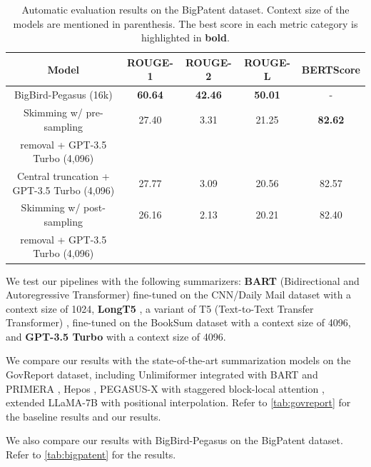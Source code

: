 \begin{table}[!ht]
	\centering

	\begin{tabular}{c c c c c}
		\hline
		\textbf{Model} & \textbf{ROUGE-1} & \textbf{ROUGE-2} & \textbf{ROUGE-L} &
		\textbf{BERTScore} \\
		\hline
		BigBird-Pegasus (16k) & \textbf{60.64} & \textbf{42.46} & \textbf{50.01} & - \\
		\hline
		Skimming w/ pre-sampling & 27.40 & 3.31 & 21.25 & \textbf{82.62} \\
		removal + GPT-3.5 Turbo (4,096) & & & & \\
		Central truncation + GPT-3.5 Turbo (4,096) & 27.77 & 3.09 & 20.56 & 82.57 \\
		Skimming w/ post-sampling & 26.16 & 2.13 & 20.21 & 82.40 \\
		removal + GPT-3.5 Turbo (4,096) & & & & \\
		\hline
	\end{tabular}

	\caption{Automatic evaluation results on the BigPatent dataset. Context size of the models are
	mentioned in parenthesis. The best score in each metric category is highlighted in \textbf{bold}.}
	\label{tab:bigpatent}
\end{table}

We test our pipelines with the following summarizers: \textbf{BART} (Bidirectional
and Autoregressive Transformer) \cite{lewis-etal-2020-bart} fine-tuned on the
CNN/Daily Mail dataset \cite{nallapati2016abstractive} with a context size of 1024,
\textbf{LongT5} \cite{guo2021longt5}, a variant of T5 (Text-to-Text Transfer
Transformer) \cite{raffel2020exploring}, fine-tuned on the BookSum dataset with
a context size of 4096, and \textbf{GPT-3.5 Turbo} \cite{brown2020language} with a
context size of 4096.

We compare our results with the state-of-the-art summarization models on the GovReport dataset,
including Unlimiformer \cite{bertsch2023unlimiformer} integrated with BART \cite{lewis-etal-2020-bart}
and PRIMERA \cite{beltagy2020longformer}, Hepos \cite{huang-etal-2021-efficient},
PEGASUS-X with staggered block-local attention \cite{phang2022investigating}, extended
LLaMA-7B with positional interpolation.
Refer to \autoref{tab:govreport} for the baseline results and our results.

We also compare our results with BigBird-Pegasus \cite{zaheer2020big} on the BigPatent dataset.
Refer to \autoref{tab:bigpatent} for the results.

